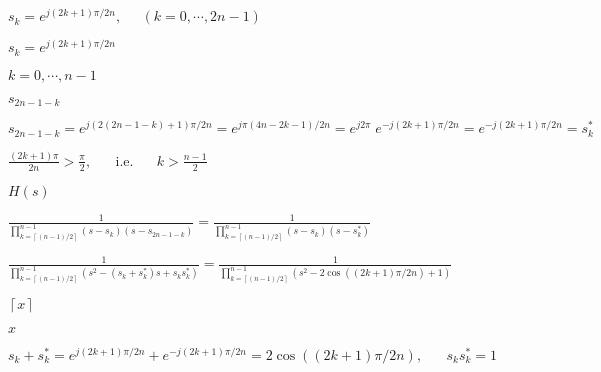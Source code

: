 \documentclass{article}
\def\lthtmlcheckvsize{\ifdim\ht\sizebox<\vsize 
  \ifdim\wd\sizebox<\hsize\expandafter\hfill\fi \expandafter\vfill
  \else\expandafter\vss\fi}%
\begin{document}
{\newpage\clearpage
{}%
$\displaystyle s_k=e^{j(2k+1)\pi/2n},\;\;\;\;\;(k=0,\cdots,2n-1)
    $%
\lthtmlindisplaymathZ
\lthtmlcheckvsize\clearpage}

{\newpage\clearpage
{}%
$s_k=e^{j(2 k+1)\pi/2n}$%
\lthtmlindisplaymathZ
\lthtmlcheckvsize\clearpage}

{\newpage\clearpage
{}%
$k=0,\cdots,n-1$%
\lthtmlindisplaymathZ
\lthtmlcheckvsize\clearpage}

{\newpage\clearpage
{}%
$s_{2n-1-k}$%
\lthtmlindisplaymathZ
\lthtmlcheckvsize\clearpage}

{\newpage\clearpage
{}%
$\displaystyle s_{2n-1-k}=e^{j(2(2n-1-k)+1)\pi/2n}=e^{j\pi(4n-2k-1)/2n}
      =e^{j2\pi} \;e^{-j(2k+1)\pi/2n} =e^{-j(2 k+1)\pi/2n}=s_k^*
    $%
\lthtmlindisplaymathZ
\lthtmlcheckvsize\clearpage}

{\newpage\clearpage
{}%
$\displaystyle \frac{(2k+1)\pi}{2n}>\frac{\pi}{2},\;\;\;\;\;\;\mbox{i.e.}\;\;\;\;\;\;
      k>\frac{n-1}{2}
    $%
\lthtmlindisplaymathZ
\lthtmlcheckvsize\clearpage}

{\newpage\clearpage
{}%
$\displaystyle H(s)$%
\lthtmlindisplaymathZ
\lthtmlcheckvsize\clearpage}

{\newpage\clearpage
{}%
$\displaystyle \frac{1}{\prod_{k=\left\lceil (n-1)/2 \right\rceil}^{n-1} (s-s_k)(s-s_{2n-1-k})}
=\frac{1}{\prod_{k=\left\lceil (n-1)/2 \right\rceil}^{n-1}(s-s_k)(s-s_k^*)}$%
\lthtmlindisplaymathZ
\lthtmlcheckvsize\clearpage}

{\newpage\clearpage
{}%
$\displaystyle \frac{1}{\prod_{k=\left\lceil (n-1)/2 \right\rceil}^{n-1}(s^2-(s_k+s_k^*)s+s_ks_k^*)}
=\frac{1}{\prod_{k=\left\lceil (n-1)/2 \right\rceil}^{n-1}(s^2-2\cos((2 k+1)\pi/2n)+1)}$%
\lthtmlindisplaymathZ
\lthtmlcheckvsize\clearpage}

{\newpage\clearpage
{}%
$\left\lceil x\right\rceil$%
\lthtmlindisplaymathZ
\lthtmlcheckvsize\clearpage}

{\newpage\clearpage
{}%
$x$%
\lthtmlindisplaymathZ
\lthtmlcheckvsize\clearpage}

{\newpage\clearpage
{}%
$\displaystyle s_k+s_k^*=e^{j(2 k+1)\pi/2n}+e^{-j(2 k+1)\pi/2n} =2\cos((2 k+1)\pi/2n),
      \;\;\;\;\;\;      s_k s_k^*=1
    $%
\lthtmlindisplaymathZ
\lthtmlcheckvsize\clearpage}
\end{document}
